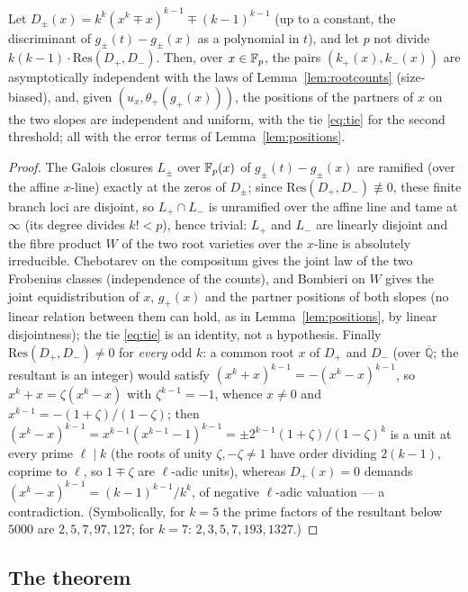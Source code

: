 \begin{lemma}\label{lem:twoslopes}
Let $D_\pm(x)=k^k(x^k\mp x)^{k-1}\mp(k-1)^{k-1}$ (up to a constant, the discriminant of $g_\pm(t)-g_\pm(x)$ as a polynomial in $t$), and let $p$ not
divide $k(k-1)\cdot\mathrm{Res}(D_+,D_-)$.  Then, over $x\in\mathbb{F}_p$, the pairs $(k_+(x),k_-(x))$ are asymptotically independent with the laws of
Lemma~\ref{lem:rootcounts} (size-biased), and, given $(u_x,\theta_+(g_+(x)))$, the positions of the partners of $x$ on the two slopes are independent and
uniform, with the tie \eqref{eq:tie} for the second threshold; all with the error terms of Lemma~\ref{lem:positions}.
\end{lemma}
\begin{proof}
The Galois closures $L_\pm$ over $\mathbb{F}_p(x)$ of $g_\pm(t)-g_\pm(x)$ are ramified (over the affine $x$-line) exactly at the zeros of $D_\pm$; since
$\mathrm{Res}(D_+,D_-)\not\equiv0$, these finite branch loci are disjoint, so $L_+\cap L_-$ is unramified over the affine line and tame at $\infty$
(its degree divides $k!<p$), hence trivial: $L_+$ and $L_-$ are linearly disjoint and the fibre product $W$ of the two root varieties over the $x$-line is
absolutely irreducible.  Chebotarev on the compositum gives the joint law of the two Frobenius classes (independence of the counts), and Bombieri on $W$
gives the joint equidistribution of $x$, $g_+(x)$ and the partner positions of both slopes (no linear relation between them can hold, as in
Lemma~\ref{lem:positions}, by linear disjointness); the tie \eqref{eq:tie} is an identity, not a hypothesis.  Finally $\mathrm{Res}(D_+,D_-)\ne0$ for \emph{every} odd $k$: a common root $x$ of $D_+$ and $D_-$ (over $\overline{\mathbb Q}$; the
resultant is an integer) would satisfy $(x^k+x)^{k-1}=-(x^k-x)^{k-1}$, so $x^k+x=\zeta(x^k-x)$ with $\zeta^{k-1}=-1$, whence $x\ne0$ and
$x^{k-1}=-(1+\zeta)/(1-\zeta)$; then $(x^k-x)^{k-1}=x^{k-1}(x^{k-1}-1)^{k-1}=\pm2^{k-1}(1+\zeta)/(1-\zeta)^{k}$ is a unit at every prime $\ell\mid k$
(the roots of unity $\zeta,-\zeta\ne1$ have order dividing $2(k-1)$, coprime to $\ell$, so $1\mp\zeta$ are $\ell$-adic units), whereas $D_+(x)=0$
demands $(x^k-x)^{k-1}=(k-1)^{k-1}/k^k$, of negative $\ell$-adic valuation — a contradiction.  (Symbolically, for $k=5$ the prime factors of the
resultant below $5000$ are $2,5,7,97,127$; for $k=7$: $2,3,5,7,193,1327$.)
\end{proof}

\subsection*{The theorem}

